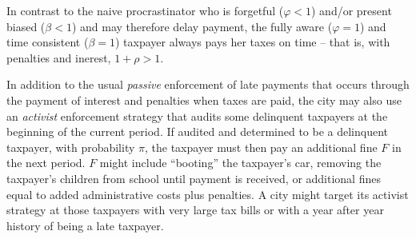 \documentclass[12pt]{article}
\begin{document}
In contrast to the naive procrastinator who is forgetful ($\varphi
<1$) and/or present biased ($\beta < 1$) and may therefore delay
payment, the fully aware ($\varphi= 1$) and time consistent ($\beta =
1$) taxpayer always pays her taxes on time -- that is, with penalties and inerest, $1 + \rho >
1$.

In addition to the usual \textit{passive} enforcement of late payments
that occurs through the payment of interest and penalties when taxes
are paid, the city may also use an \textit{activist} enforcement
strategy that audits some delinquent taxpayers at the beginning of the
current period. If audited and determined to be a delinquent taxpayer, with
probability $\pi$, the taxpayer must then pay an additional fine $F$
in the next period.  $F$ might include ``booting'' the taxpayer's car,
removing the taxpayer's children from school until payment is
received, or additional fines equal to added administrative costs plus
penalties.  A city might target its activist strategy at those
taxpayers with very large tax bills or with a year after year history of being a late taxpayer.
\end{document}
